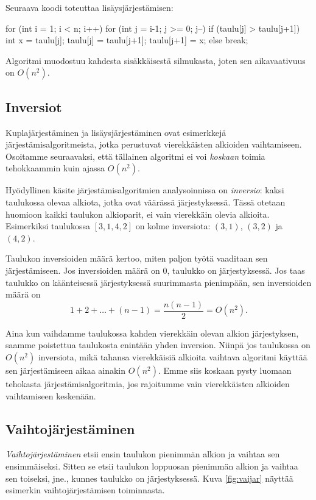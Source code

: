 Seuraava koodi toteuttaa lisäysjärjestämisen:

\begin{code}
for (int i = 1; i < n; i++) {
    for (int j = i-1; j >= 0; j--) {
        if (taulu[j] > taulu[j+1]) {
            int x = taulu[j];
            taulu[j] = taulu[j+1];
            taulu[j+1] = x;
        } else break;
    }
}
\end{code}

Algoritmi muodostuu kahdesta sisäkkäisestä silmukasta,
joten sen aikavaativuus on $O(n^2)$.

\subsection{Inversiot}

Kuplajärjestäminen ja lisäysjärjestäminen ovat esimerkkejä
järjestämis\-algoritmeista, jotka perustuvat vierekkäisten
alkioiden vaihtamiseen.
Osoitamme seuraavaksi, että tällainen algoritmi ei voi \emph{koskaan}
toimia tehokkaammin kuin ajassa $O(n^2)$.

Hyödyllinen käsite järjestämisalgoritmien analysoinnissa
on \emph{inversio}: kaksi taulukossa olevaa alkiota,
jotka ovat väärässä järjestyksessä.
Tässä otetaan huomioon kaikki taulukon alkioparit,
ei vain vierekkäin olevia alkioita.
Esimerkiksi taulukossa $[3,1,4,2]$ on kolme inversiota:
$(3,1)$, $(3,2)$ ja $(4,2)$.

Taulukon inversioiden määrä kertoo, miten paljon työtä
vaaditaan sen järjestämiseen. Jos inversioiden määrä on 0,
taulukko on järjestyksessä.
Jos taas taulukko on käänteisessä järjestyksessä
suurimmasta pienimpään, sen inversioiden määrä on
\[
1 + 2 + \dots + (n-1) = \frac{n(n-1)}{2} = O(n^2).
\]

Aina kun vaihdamme taulukossa kahden vierekkäin olevan
alkion järjes\-tyksen, saamme poistettua taulukosta enintään
yhden inversion.
Niinpä jos taulukossa on $O(n^2)$ inversiota,
mikä tahansa vierekkäisiä alkioita vaihtava algoritmi
käyttää sen järjestämiseen aikaa ainakin $O(n^2)$.
Emme siis koskaan pysty luomaan tehokasta järjestämisalgoritmia,
jos rajoitumme vain vierekkäisten alkioiden vaihtamiseen keskenään.

\subsection{Vaihtojärjestäminen}

\emph{Vaihtojärjestäminen} etsii ensin taulukon pienimmän alkion
ja vaihtaa sen ensimmäiseksi.
Sitten se etsii taulukon loppuosan pienimmän alkion ja
vaihtaa sen toiseksi, jne., kunnes taulukko on järjestyksessä.
Kuva \ref{fig:vaijar} näyttää esimerkin
vaihtojärjestämisen toiminnasta.

